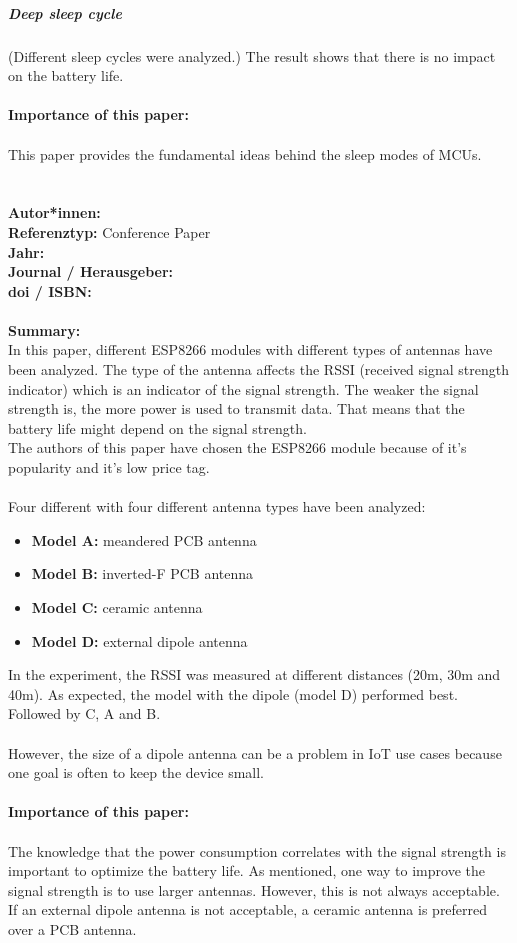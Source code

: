 \documentclass{report}
\newcommand{\createConferencePaperHeader}[1]{
    {\let\clearpage\relax \chapter{\citetitle{#1}}}
    \noindent
    \textbf{Autor*innen:} \citeauthor{#1} \\
    \textbf{Referenztyp:} Conference Paper\\
    \textbf{Jahr:} \citeyear{#1} \\
    \textbf{Journal / Herausgeber:} \citelist{#1}{publisher}\\
    \textbf{doi / ISBN:} \citefield{#1}{doi} \\\\
    \textbf{Summary:}\\
}
\begin{document}
\paragraph{Deep sleep cycle} (Different sleep cycles were analyzed.)
The result shows that there is no impact on the battery life.
\\\\
\textbf{Importance of this paper:}
\\\\
This paper provides the fundamental ideas behind the sleep modes of MCUs.





\createConferencePaperHeader{yoppy_rssi_2018}
In this paper, different ESP8266 modules with different types of antennas have been analyzed.
The type of the antenna affects the RSSI (received signal strength indicator) which is an indicator of the signal strength.
The weaker the signal strength is, the more power is used to transmit data.
That means that the battery life might depend on the signal strength.
\\
The authors of this paper have chosen the ESP8266 module because of it's popularity and it's low price tag.
\\\\
Four different with four different antenna types have been analyzed:\\
\begin{itemize}
    \item \textbf{Model A:} meandered PCB antenna
    \item \textbf{Model B:} inverted-F PCB antenna
    \item \textbf{Model C:} ceramic antenna
    \item \textbf{Model D:} external dipole antenna
\end{itemize}

In the experiment, the RSSI was measured at different distances (20m, 30m and 40m).
As expected, the model with the dipole (model D) performed best. Followed by C, A and B.
\\\\
However, the size of a dipole antenna can be a problem in IoT use cases because one goal is often to keep the device small.
\\\\
\textbf{Importance of this paper:}
\\\\
The knowledge that the power consumption correlates with the signal strength is important to optimize the battery life.
As mentioned, one way to improve the signal strength is to use larger antennas. However, this is not always acceptable.
If an external dipole antenna is not acceptable, a ceramic antenna is preferred over a PCB antenna.
\end{document}
